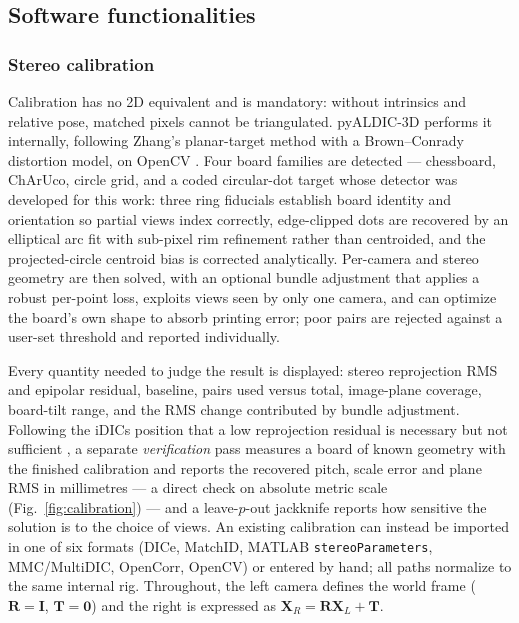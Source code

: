 \subsection{Software functionalities}
\label{sec:func}

\subsubsection{Stereo calibration}
\label{sec:calib}

Calibration has no 2D equivalent and is mandatory: without intrinsics and relative pose, matched pixels cannot be triangulated. pyALDIC-3D performs it internally, following Zhang's planar-target method \cite{zhang2000flexible} with a Brown--Conrady distortion model, on OpenCV \cite{bradski2000opencv}. Four board families are detected --- chessboard, ChArUco, circle grid, and a coded circular-dot target whose detector was developed for this work: three ring fiducials establish board identity and orientation so partial views index correctly, edge-clipped dots are recovered by an elliptical arc fit with sub-pixel rim refinement rather than centroided, and the projected-circle centroid bias is corrected analytically. Per-camera and stereo geometry are then solved, with an optional bundle adjustment that applies a robust per-point loss, exploits views seen by only one camera, and can optimize the board's own shape to absorb printing error; poor pairs are rejected against a user-set threshold and reported individually.

Every quantity needed to judge the result is displayed: stereo reprojection RMS and epipolar residual, baseline, pairs used versus total, image-plane coverage, board-tilt range, and the RMS change contributed by bundle adjustment. Following the iDICs position that a low reprojection residual is necessary but not sufficient \cite{idics2018gpg}, a separate \emph{verification} pass measures a board of known geometry with the finished calibration and reports the recovered pitch, scale error and plane RMS in millimetres --- a direct check on absolute metric scale (Fig.~\ref{fig:calibration}) --- and a leave-$p$-out jackknife reports how sensitive the solution is to the choice of views. An existing calibration can instead be imported in one of six formats (DICe, MatchID, MATLAB \texttt{stereoParameters}, MMC/MultiDIC, OpenCorr, OpenCV) or entered by hand; all paths normalize to the same internal rig. Throughout, the left camera defines the world frame ($\mathbf{R}=\mathbf{I}$, $\mathbf{T}=\mathbf{0}$) and the right is expressed as $\mathbf{X}_R = \mathbf{R}\mathbf{X}_L + \mathbf{T}$.

